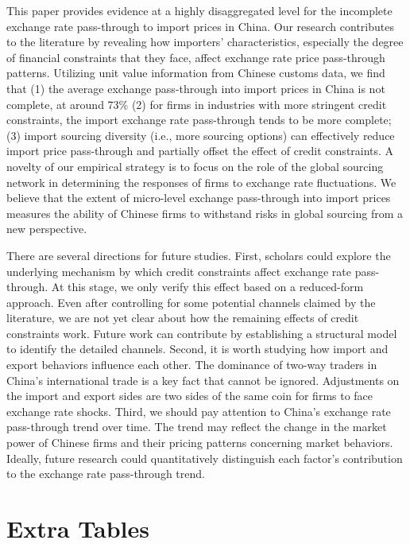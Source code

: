 This paper provides evidence at a highly disaggregated level for the incomplete exchange rate pass-through to import prices in China. Our research contributes to the literature by revealing how importers' characteristics, especially the degree of financial constraints that they face, affect exchange rate price pass-through patterns. Utilizing unit value information from Chinese customs data, we find that (1) the average exchange pass-through into import prices in China is not complete, at around 73\% (2) for firms in industries with more stringent credit constraints, the import exchange rate pass-through tends to be more complete; (3) import sourcing diversity (i.e., more sourcing options) can effectively reduce import price pass-through and partially offset the effect of credit constraints. A novelty of our empirical strategy is to focus on the role of the global sourcing network in determining the responses of firms to exchange rate fluctuations. We believe that the extent of micro-level exchange pass-through into import prices measures the ability of Chinese firms to withstand risks in global sourcing from a new perspective.

There are several directions for future studies. First, scholars could explore the underlying mechanism by which credit constraints affect exchange rate pass-through. At this stage, we only verify this effect based on a reduced-form approach. Even after controlling for some potential channels claimed by the literature, we are not yet clear about how the remaining effects of credit constraints work. Future work can contribute by establishing a structural model to identify the detailed channels. Second, it is worth studying how import and export behaviors influence each other. The dominance of two-way traders in China's international trade is a key fact that cannot be ignored. Adjustments on the import and export sides are two sides of the same coin for firms to face exchange rate shocks. Third, we should pay attention to China's exchange rate pass-through trend over time. The trend may reflect the change in the market power of Chinese firms and their pricing patterns concerning market behaviors. Ideally, future research could quantitatively distinguish each factor's contribution to the exchange rate pass-through trend. 

\newpage 


\appendix

\newpage

\section{Extra Tables}\label{Appendix-Tables}

